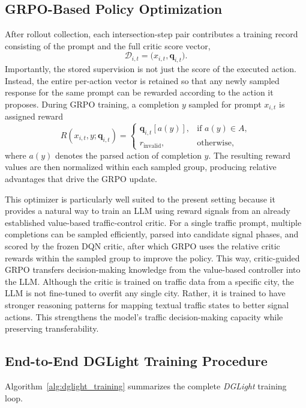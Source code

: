\subsection{GRPO-Based Policy Optimization}
After rollout collection, each intersection-step pair contributes a training record consisting of the prompt and the full critic score vector,
\[
\mathcal{D}_{i,t} = \bigl(x_{i,t}, \mathbf{q}_{i,t}\bigr).
\]
Importantly, the stored supervision is not just the score of the executed action. Instead, the entire per-action vector is retained so that any newly sampled response for the same prompt can be rewarded according to the action it proposes. During GRPO training, a completion $y$ sampled for prompt $x_{i,t}$ is assigned reward
\[
R\!\left(x_{i,t}, y; \mathbf{q}_{i,t}\right) =
\begin{cases}
\mathbf{q}_{i,t}[a(y)], & \text{if } a(y) \in A, \\
r_{\mathrm{invalid}}, & \text{otherwise},
\end{cases}
\]
where $a(y)$ denotes the parsed action of completion $y$. The resulting reward values are then normalized within each sampled group, producing relative advantages that drive the GRPO update.

This optimizer is particularly well suited to the present setting because it provides a natural way to train an LLM using reward signals from an already established value-based traffic-control critic. For a single traffic prompt, multiple completions can be sampled efficiently, parsed into candidate signal phases, and scored by the frozen DQN critic, after which GRPO uses the relative critic rewards within the sampled group to improve the policy. This way, critic-guided GRPO transfers decision-making knowledge from the value-based controller into the LLM. Although the critic is trained on traffic data from a specific city, the LLM is not fine-tuned to overfit any single city. Rather, it is trained to have stronger reasoning patterns for mapping textual traffic states to better signal actions. This strengthens the model's traffic decision-making capacity while preserving transferability.

\subsection{End-to-End DGLight Training Procedure}
Algorithm~\ref{alg:dglight_training} summarizes the complete \textit{DGLight} training loop.

